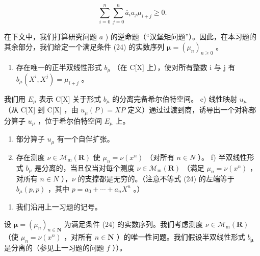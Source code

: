 \[
\sum_ {i = 0} ^ {n} \sum_ {j = 0} ^ {n} \overline {{a}} _ {i} a _ {j} \mu_ {i + j} \geqslant 0.\tag{24}
\]

在下文中，我们打算研究问题 \(a\) ) 的逆命题（“汉堡矩问题”）。因此，在本习题的其余部分，我们给定一个满足条件 (24) 的实数序列 \(\boldsymbol{\mu} = (\mu_n)_{n \geqslant 0}\) 。

\begin{enumerate}
\def\labelenumi{\alph{enumi})}
\setcounter{enumi}{1}
\tightlist
\item
  存在唯一的正半双线性形式 \(b_{\mu}\) （在 C{[}X{]} 上），使对所有整数 i 与 j 有 \(b_{\mu}(X^{i}, X^{j}) = \mu_{i+j}\) 。
\end{enumerate}

我们用 \(E_{\mu}\) 表示 C{[}X{]} 关于形式 \(b_{\mu}\) 的分离完备希尔伯特空间。 c) 线性映射 \(u_{\mu}\) （从 C{[}X{]} 到 C{[}X{]} ，由 \(u_{\mu}(P) = XP\) 定义）通过过渡到商，诱导出一个对称部分算子 \(u_{\mu}\) ，位于希尔伯特空间 \(E_{\mu}\) 上。

\begin{enumerate}
\def\labelenumi{\alph{enumi})}
\setcounter{enumi}{3}
\item
  部分算子 \(u_{\mu}\) 有一个自伴扩张。
\item
  存在测度 \(\nu\in\mathcal{M}_{\mathrm{m}}(\mathbf{R})\) 使 \(\mu_{n}=\nu(x^{n})\) （对所有 \(n\in N\) ）。 f) 半双线性形式 \(b_{\mu}\) 是分离的，当且仅当对每个测度 \(\nu\in\mathcal{M}_{\mathrm{m}}(\mathbf{R})\) （满足 \(\mu_{n}=\nu(x^{n})\) ，对所有 \(n\in N\) ），\(\nu\) 的支撑都是无穷的。（注意不等式 (24) 的左端等于 \(b_{\mu}(p,p)\) ，其中 \(p=a_{0}+\cdots+a_{n}X^{n}\) 。）
\end{enumerate}

\begin{enumerate}
\def\labelenumi{\arabic{enumi})}
\setcounter{enumi}{21}
\tightlist
\item
  我们沿用上一习题的记号。
\end{enumerate}

设 \(\boldsymbol{\mu} = (\mu_n)_{n\in \mathbf{N}}\) 为满足条件 (24) 的实数序列。我们考虑测度 \(\nu \in \mathcal{M}_{\mathrm{m}}(\mathbf{R})\) （使 \(\mu_{n} = \nu (x^{n})\) ，对所有 \(n\in \mathbf{N}\) ）的唯一性问题。我们假设半双线性形式 \(b_{\boldsymbol{\mu}}\) 是分离的（参见上一习题的问题 \(f\) ））。

